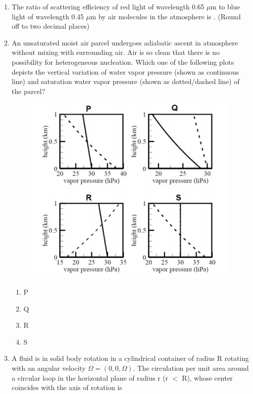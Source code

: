 \documentclass[a4paper,10pt]{article}
\begin{document}
\begin{enumerate}
\hfill{}

\item The ratio of scattering efficiency of red light of wavelength 0.65 $\mu$m to blue light of wavelength 0.45 $\mu$m by air molecules in the atmosphere is \underline{\hspace{2cm}}. (Round off to two decimal places)

\hfill{}

\item An unsaturated moist air parcel undergoes adiabatic ascent in atmosphere without mixing with surrounding air. Air is so clean that there is no possibility for heterogeneous nucleation. Which one of the following plots depicts the vertical variation of water vapor pressure (shown as continuous line) and saturation water vapor pressure (shown as dotted/dashed line) of the parcel?
\begin{figure}[H]
    \centering
    \includegraphics[width=0.8\columnwidth]{q163.png}
    \caption*{}
    \label{fig:q163}
\end{figure}

\hfill{}
\begin{enumerate}
    \item P
    \item Q
    \item R
    \item S
\end{enumerate}

\item A fluid is in solid body rotation in a cylindrical container of radius R rotating with an angular velocity $\Omega = (0, 0, \Omega)$. The circulation per unit area around a circular loop in the horizontal plane of radius r (r $<$ R), whose center coincides with the axis of rotation is


\end{enumerate}
\end{document}
